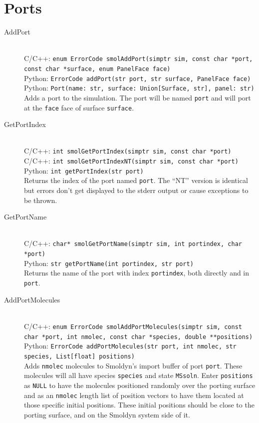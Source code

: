 \documentclass {book}
\newcommand {\ttt} {\texttt}
\begin{document}
\section{Ports}

\begin{description}

\item[AddPort]
\hfill \\
C/C++: \ttt{enum ErrorCode smolAddPort(simptr sim, const char *port, const char *surface, enum PanelFace face)}\\
Python: \ttt{ErrorCode addPort(str port, str surface, PanelFace face)}\\
Python: \ttt{Port(name: str, surface: Union[Surface, str], panel: str)}\\
Adds a port to the simulation. The port will be named \ttt{port} and will port at the \ttt{face} face of surface \ttt{surface}.

\item[GetPortIndex]
\hfill \\
C/C++: \ttt{int smolGetPortIndex(simptr sim, const char *port)}\\
C/C++: \ttt{int smolGetPortIndexNT(simptr sim, const char *port)}\\
Python: \ttt{int getPortIndex(str port)}\\
Returns the index of the port named \ttt{port}. The ``NT'' version is identical but errors don't get displayed to the stderr output or cause exceptions to be thrown.

\item[GetPortName]
\hfill \\
C/C++: \ttt{char* smolGetPortName(simptr sim, int portindex, char *port)}\\
Python: \ttt{str getPortName(int portindex, str port)}\\
Returns the name of the port with index \ttt{portindex}, both directly and in \ttt{port}.

\item[AddPortMolecules]
\hfill \\
C/C++: \ttt{enum ErrorCode smolAddPortMolecules(simptr sim, const char *port, int nmolec, const char *species, double **positions)}\\
Python: \ttt{ErrorCode addPortMolecules(str port, int nmolec, str species, List[float] positions)}\\
Adds \ttt{nmolec} molecules to Smoldyn's import buffer of port \ttt{port}. These molecules will all have species \ttt{species} and state \ttt{MSsoln}. Enter \ttt{positions} as \ttt{NULL} to have the molecules positioned randomly over the porting surface and as an \ttt{nmolec} length list of position vectors to have them located at those specific initial positions. These initial positions should be close to the porting surface, and on the Smoldyn system side of it.


\end{description}
\end{document}
